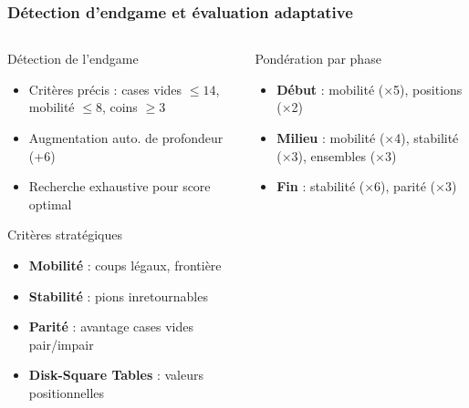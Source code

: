 \documentclass{beamer}
\begin{document}
\begin{frame}
    \frametitle{Détection d'endgame et évaluation adaptative}
    
    \begin{columns}
        \begin{column}{0.48\textwidth}
            \begin{block}{Détection de l'endgame}
            \scriptsize
            \begin{itemize}
                \item Critères précis : cases vides $\leq 14$, mobilité $\leq 8$, coins $\geq 3$
                \item Augmentation auto. de profondeur (+6)
                \item Recherche exhaustive pour score optimal
            \end{itemize}
            \end{block}
            
            \begin{block}{Critères stratégiques}
            \scriptsize
            \begin{itemize}
                \item \textbf{Mobilité} : coups légaux, frontière
                \item \textbf{Stabilité} : pions inretournables
                \item \textbf{Parité} : avantage cases vides pair/impair
                \item \textbf{Disk-Square Tables} : valeurs positionnelles
            \end{itemize}
            \end{block}
        \end{column}
        
        \begin{column}{0.48\textwidth}
            \begin{block}{Pondération par phase}
            \scriptsize
            \begin{itemize}
                \item \textbf{Début} : mobilité (×5), positions (×2)
                \item \textbf{Milieu} : mobilité (×4), stabilité (×3), ensembles (×3)
                \item \textbf{Fin} : stabilité (×6), parité (×3)
            \end{itemize}
            \end{block}
        \end{column}
    \end{columns}
\end{frame}
\end{document}
